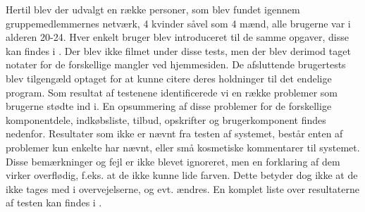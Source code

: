 Hertil blev der udvalgt en række personer, som blev fundet igennem gruppemedlemmernes netværk, 4 kvinder såvel som 4 mænd, alle brugerne var i alderen 20-24.
Hver enkelt bruger blev introduceret til de samme opgaver, disse kan findes i .
Der blev ikke filmet under disse tests, men der blev derimod taget notater for de forskellige mangler ved hjemmesiden. 
De afsluttende brugertests blev tilgengæld optaget for at kunne citere deres holdninger til det endelige program.
Som resultat af testenene identificerede vi en række problemer som brugerne stødte ind i.
En opsummering af disse problemer for de forskellige komponentdele, indkøbsliste, tilbud, opskrifter og brugerkomponent findes nedenfor.
Resultater som ikke er nævnt fra testen af systemet, består enten af problemer kun enkelte har nævnt, eller små kosmetiske kommentarer til systemet.
Disse bemærkninger og fejl er ikke blevet ignoreret, men en forklaring af dem virker overflødig, f.eks. at de ikke kunne lide farven. 
Dette betyder dog ikke at de ikke tages med i overvejelserne, og evt. ændres.
En komplet liste over resultaterne af testen kan findes i .
